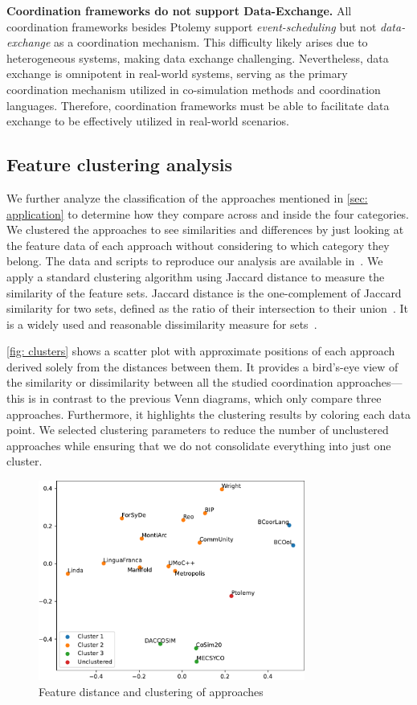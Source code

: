 \documentclass[runningheads]{llncs}
\begin{document}
\textbf{Coordination frameworks do not support Data-Exchange.}
All coordination frameworks besides Ptolemy support \textit{event-scheduling} but not \textit{data-exchange} as a coordination mechanism.
This difficulty likely arises due to heterogeneous systems, making data exchange challenging.
Nevertheless, data exchange is omnipotent in real-world systems, serving as the primary coordination mechanism utilized in co-simulation methods and coordination languages.
Therefore, coordination frameworks must be able to facilitate data exchange to be effectively utilized in real-world scenarios.

\subsection{Feature clustering analysis}

We further analyze the classification of the approaches mentioned in \autoref{sec: application} to determine how they compare across and inside the four categories.
We clustered the approaches to see similarities and differences by just looking at the feature data of each approach without considering to which category they belong.
The data and scripts to reproduce our analysis are available in~\cite{timkrauterArtifactsCoordination2024}.
We apply a standard clustering algorithm using Jaccard distance to measure the similarity of the feature sets.
Jaccard distance is the one-complement of Jaccard similarity for two sets, defined as the ratio of their intersection to their union~\cite{levandowskyDistanceSets1971}.
It is a widely used and reasonable dissimilarity measure for sets~\cite{levandowskyDistanceSets1971}.

\autoref{fig: clusters} shows a scatter plot with approximate positions of each approach derived solely from the distances between them.
It provides a bird's-eye view of the similarity or dissimilarity between all the studied coordination approaches---this is in contrast to the previous Venn diagrams, which only compare three approaches.
Furthermore, it highlights the clustering results by coloring each data point.
We selected clustering parameters to reduce the number of unclustered approaches while ensuring that we do not consolidate everything into just one cluster.
%
\begin{figure}[ht]
	\centering
	\includegraphics[width=0.78\textwidth]{images/approach_scatter}
    \caption{Feature distance and clustering of approaches}
	\label{fig: clusters}
\end{figure}
\end{document}
